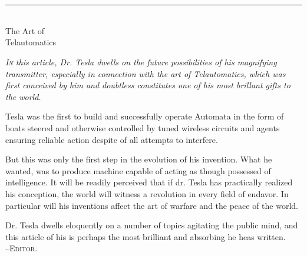 \documentclass[a4paper,12pt,english,twoside,openright]{memoir}
\begin{document}
\newpage

	{\centering
		\aldine\\
		\aldine\hspace{1.2em}\aldine
		\par}
	\vspace*{2cm}
	


\cleardoublepage
\thispagestyle{empty}
\vspace*{5em}
\begin{center}
	\bfseries
	\\
	\noindent\rule{.5\linewidth}{1pt}\\
	\medskip
	{\noindent\LARGE The Art of\\Telautomatics}
	
	\bigskip
	
	
	{\normalfont\smallskip\footnotesize\protect\parbox{.75\linewidth}{\itshape
			\lettrine[lines=2]{I}{n} this article, Dr. Tesla dwells on the future possibilities of his magnifying transmitter, especially in connection with the art of Telautomatics, which was first conceived by him and doubtless constitutes one of his most brillant gifts to the world.
			
			Tesla was the first to build and successfully operate Automata in the form of boats steered and otherwise controlled by tuned wireless circuits and agents ensuring reliable action despite of all attempts to interfere.
			
			But this was only the first step in the evolution of his invention. What he wanted, was to produce machine capable of acting as though possessed of intelligence. It will be readily perceived that if dr. Tesla has practically realized his conception, the world will witness a revolution in every field of endavor. In particular will his inventions affect the art of warfare and the peace of the world.
			
			Dr. Tesla dwells eloquently on a number of topics agitating the public mind, and this article of his is perhaps the most brilliant and absorbing he heas written.\\
			
			\hfill --\scshape{Editor}.
		}
		\par
	}
	\vspace*{5em}
\end{center}
\end{document}
